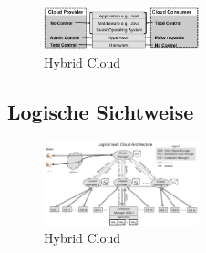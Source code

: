 \begin{figure}[H]
    \centering
	\includegraphics[width=0.4\textwidth]{Images/IaaSControl}
	\caption{Hybrid Cloud \cite{Badger}}
	\label{IaaSControl}
\end{figure}

\subsection{Logische Sichtweise}
\begin{figure}[H]
    \centering
	\includegraphics[width=0.4\textwidth]{Images/IaaSLogic}
	\caption{Hybrid Cloud \cite{Badger}}
	\label{IaaSLogic}
\end{figure}

\pagebreak